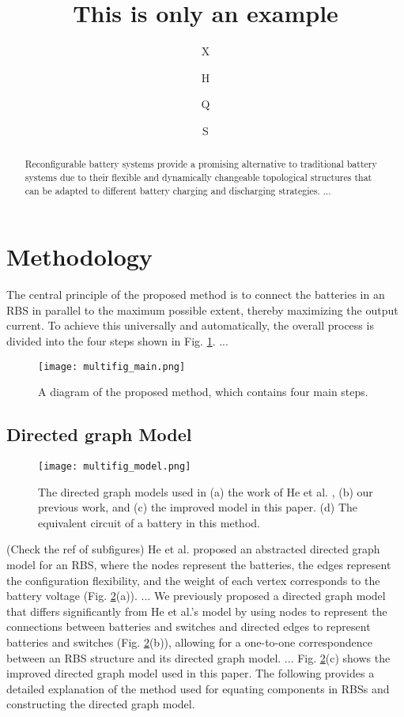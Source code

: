 \documentclass[a4paper]{article}
\title{This is only an example}
\author[1$\dag$]{X}
\author[1$\dag$]{H}
\author[1*]{Q}
\author[1,2]{S}
\affil[1]{School of R, China}
\affil[2]{School of A, China}
\affil[*]{Address correspondence to: email}
\affil[$\dag$]{These authors contributed equally to this work.}
\begin{document}
\maketitle

\begin{abstract}
Reconfigurable battery systems provide a promising alternative to traditional battery systems due to their flexible and dynamically changeable topological structures that can be adapted to different battery charging and discharging strategies.
...
\end{abstract}

\section{Methodology}

The central principle of the proposed method is to connect the batteries in an RBS in parallel to the maximum possible extent, thereby maximizing the output current.
To achieve this universally and automatically, the overall process is divided into the four steps shown in Fig. \ref{multifig:multifig_main}.
...


\begin{figure}[htbp]
    \centering
    \texttt{[image: multifig\_main.png]}
    \caption{
        A diagram of the proposed method, which contains four main steps.
    }
    \label{multifig:multifig_main}
\end{figure}


\subsection{Directed graph Model}


\begin{figure}[htbp]
    \centering
    \texttt{[image: multifig\_model.png]}
    \caption{
        The directed graph models used in (a) the work of He et al. \cite{heExploringAdaptiveReconfiguration2013}, (b) our previous work, and (c) the improved model in this paper.
        (d) The equivalent circuit of a battery in this method.
    }
    \label{multifig:multifig_model}
\end{figure}


(Check the ref of subfigures)
He et al. \cite{heExploringAdaptiveReconfiguration2013} proposed an abstracted directed graph model for an RBS, where the nodes represent the batteries, the edges represent the configuration flexibility, and the weight of each vertex corresponds to the battery voltage (Fig. \ref{multifig:multifig_model}(a)). 
...
We previously proposed a directed graph model that differs significantly from He et al.'s model by using nodes to represent the connections between batteries and switches and directed edges to represent batteries and switches (Fig. \ref{multifig:multifig_model}(b)), allowing for a one-to-one correspondence between an RBS structure and its directed graph model. 
...
Fig. \ref{multifig:multifig_model}(c) shows the improved directed graph model used in this paper.
The following provides a detailed explanation of the method used for equating components in RBSs and constructing the directed graph model.
\end{document}
